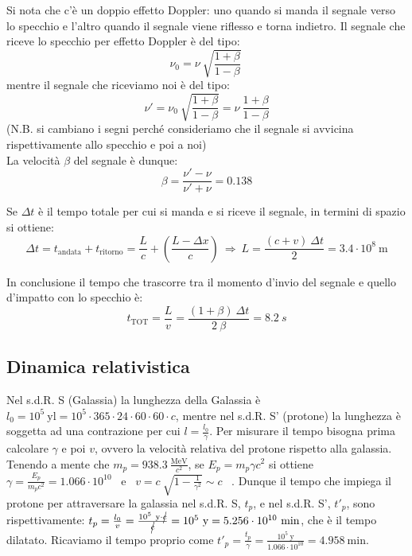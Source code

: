 \documentclass[12pt,twoside,a4]{article}
\begin{document}
\begin{solution}
	Si nota che c'è un doppio effetto Doppler: uno quando si manda il segnale verso lo specchio e l'altro quando il segnale viene riflesso e torna indietro.
 Il segnale che riceve lo specchio per effetto Doppler è del tipo: 
 \begin{equation*}
     \nu_0 =\nu \ \sqrt{\frac{1+\beta}{1-\beta}}\   
 \end{equation*}
 mentre il segnale che riceviamo noi è del tipo: 
 \begin{equation*}
     \nu' = \nu_0 \ \sqrt{\frac{1+\beta}{1-\beta}} = \nu \ \frac{1+\beta}{1-\beta} 
 \end{equation*}
 (N.B. si cambiano i segni perché consideriamo che il segnale si avvicina rispettivamente allo specchio e poi a noi) \\
 La velocità $\beta$ del segnale è dunque: 
 \begin{equation*}
 \beta = \frac{\nu' - \nu}{\nu' + \nu} = 0.138 
 \end{equation*}
 
 Se $\Delta t$ è il tempo totale per cui si manda e si riceve il segnale, in termini di spazio si ottiene: 
 \begin{equation*}
     \Delta t = t_{\mathrm{andata}} + t_{\mathrm{ritorno}} = \frac{L}{c} + \left(\frac{L-\Delta x}{c}\right)  \  \Rightarrow  \  L = \frac{(c+v) \ \Delta t}{2} = 3.4 \cdot 10^8 \ \mathrm{m} 
 \end{equation*}
 
 In conclusione il tempo che trascorre tra il momento d'invio del segnale e quello d'impatto con lo specchio è: 
 \begin{equation*}
     t_{\mathrm{TOT}} = \frac{L}{v} = \frac{(1+\beta) \ \Delta t}{2 \ \beta} = 8.2 \ s 
 \end{equation*}
\end{solution}


\newpage
\subsection{Dinamica relativistica}
\begin{solution}
	 Nel s.d.R. S (Galassia) la lunghezza della Galassia è $l_0 = 10^5 \ \mathrm{yl} = 10^5 \cdot 365 \cdot 24 \cdot 60 \cdot 60 \cdot c$, mentre nel s.d.R. S' (protone) la lunghezza è soggetta ad una contrazione per cui $l = \frac{l_0}{\gamma}$. 
 Per misurare il tempo bisogna prima calcolare $\gamma$ e poi $v$, ovvero la velocità relativa del protone rispetto alla galassia. 
 Tenendo a mente che $m_p = 938.3 \ \frac{\mathrm{MeV}}{c^2}$, se $E_p = m_p \gamma c^2$ si ottiene $\gamma = \frac{E_p}{m_p c^2} = 1.066 \cdot 10^{10}$ \ e \ $v = c \ \sqrt{1-\frac{1}{\gamma^2}} \sim c$ \ .
 Dunque il tempo che impiega il protone per attraversare la galassia nel s.d.R. S, $t_p$, e nel s.d.R. S', $t'_p$, sono rispettivamente: $t_p = \frac{l_0}{v} = \frac{10^5 \ \mathrm{y} \cdot \cancel{c}}{\cancel{c}} = 10^5 \ \mathrm{y} = 5.256 \cdot 10^{10} \ \mathrm{min}$, che è il tempo dilatato. Ricaviamo il tempo proprio come $t'_p = \frac{t_p}{\gamma} = \frac{10^5 \ \mathrm{y}}{1.066 \cdot 10^{10}} = 4.958 \ \mathrm{min}$.
\end{solution}
\end{document}
